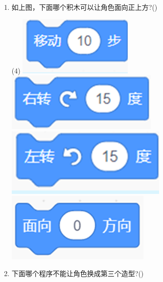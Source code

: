 \documentclass[10.5pt, a4paper]{article}
\begin{document}
\begin{enumerate}
        \item 如上图，下面哪个积木可以让角色面向正上方?(\qquad)
        \begin{tasks}(4)
            \task \includegraphics[width=.1\textwidth]{14a.png}
            \task \includegraphics[width=.1\textwidth]{14b.png}
            \task \includegraphics[width=.1\textwidth]{14c.png}
            \task \includegraphics[width=.1\textwidth]{14d.png}
        \end{tasks}
        
        \item 下面哪个程序不能让角色换成第三个造型?(\qquad)
        

\end{enumerate}
\end{document}
